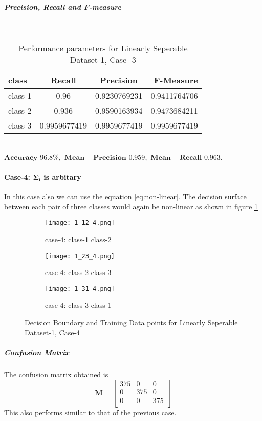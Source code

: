 \documentclass[a4paper]{article}
\begin{document}
\subparagraph{Precision, Recall and F-measure}\textcolor{white}{:}
\begin{table}[h!]
  \begin{center}
    \caption{Performance parameters for Linearly Seperable Dataset-1, Case -3}
    \label{tab:table1}
    \begin{tabular}{l|c|c|r} %
      \textbf{class} & \textbf{Recall} & \textbf{Precision} & \textbf{F-Measure}\\
      \hline
      class-1 & 0.96 & 0.9230769231 & 0.9411764706\\
      class-2 & 0.936 & 0.9590163934 & 0.9473684211\\
      class-3 & 0.9959677419 & 0.9959677419 & 0.9959677419\\
    \end{tabular}
  \end{center}
\end{table}
\\$\mathbf{Accuracy}$ 96.8$\%,$ $\mathbf{Mean -Precision}$ 0.959$,$ $\mathbf{Mean- Recall}$ 0.963$.$
\newpage
\paragraph{Case-4: $\mathbf{\Sigma_{i}}$ is arbitary}
In this case also we can use the equation \ref{eq:non-linear}. The decision surface  between each pair of three classes would again be non-linear as shown in figure \ref{fig:1_4}
\begin{figure}[h!]
  \centering
  \begin{subfigure}[b]{0.4\linewidth}
    \texttt{[image: 1\_12\_4.png]}
     \caption{case-4: class-1 class-2}
  \end{subfigure}
  \begin{subfigure}[b]{0.4\linewidth}
    \texttt{[image: 1\_23\_4.png]}
    \caption{case-4: class-2 class-3}
  \end{subfigure}
  \begin{subfigure}[b]{0.4\linewidth}
    \texttt{[image: 1\_31\_4.png]}
    \caption{case-4: class-3 class-1}
  \end{subfigure}
  \caption{Decision Boundary and Training Data points for Linearly Seperable Dataset-1, Case-4}
  \label{fig:1_4}
\end{figure}
\subparagraph{Confusion Matrix}
The confusion matrix obtained is
\[
\mathbf{M} = \left[ {\begin{array}{ccc}
375 & 0 & 0\\
0 & 375 & 0\\
0 & 0 & 375\\
\end{array}} \right]
\]This also performs similar to that of the previous case.
\end{document}
